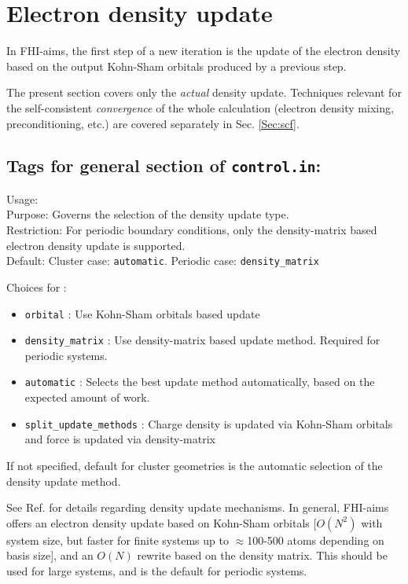 \section{Electron density update}

In FHI-aims, the first step of a new iteration is the update of the
electron density based on the output Kohn-Sham orbitals produced by a
previous step. 

The present section covers only the \emph{actual}
density update. Techniques relevant for the self-consistent
\emph{convergence} of the whole calculation (electron density mixing,
preconditioning, etc.) are covered separately in Sec. \ref{Sec:scf}.

\newpage

\subsection*{Tags for general section of \texttt{control.in}:}

{
  \noindent
  Usage:   \\[1.0ex]
  Purpose: Governs the selection of the density update
  type.\\[1.0ex]
  Restriction: For periodic boundary conditions, only the density-matrix 
    based electron density update is supported. \\[1.0ex] 
  Default: Cluster case: \texttt{automatic}. 
    Periodic case: \texttt{density\_matrix} \\ 
}

Choices for :
\begin{itemize}
  \item \texttt{orbital} : Use Kohn-Sham orbitals based update
  \item \texttt{density\_matrix} : Use density-matrix based update
    method. Required for periodic systems. 
  \item \texttt{automatic} : Selects the best
    update method automatically, based on the expected amount of
    work. 
  \item \texttt{split\_update\_methods} : Charge density is
     updated via Kohn-Sham orbitals and force is updated via density-matrix
\end{itemize} 
If not specified, default for cluster geometries is the automatic selection of the
density update method.

See Ref. \cite{Blum08} for details regarding density update
mechanisms. In general, FHI-aims offers an electron density update
based on Kohn-Sham orbitals [$O(N^2)$ with system size, but faster for
finite systems up to $\approx$100-500 atoms depending on basis
size], and an $O(N)$ rewrite based on the density matrix. This should
be used for large systems, and is the default for periodic systems.

